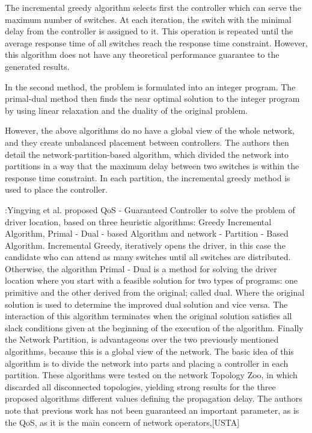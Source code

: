 \documentclass[a4paper,10pt]{article}
\begin{document}
The incremental greedy algorithm selects first the controller which can serve the maximum number of switches. At each iteration, the switch with the minimal delay from the controller is assigned to it. This operation is repeated until the average response time of all switches reach the response time constraint. However, this algorithm does not have any theoretical performance guarantee to the generated results. 

In the second method, the problem is formulated into an integer program. The primal-dual method then finds the near optimal solution to the integer program by using linear relaxation and the duality of the original problem. 

However, the above algorithms do no have a global view of the whole network, and they create unbalanced placement between controllers. The authors then detail the network-partition-based algorithm, which divided the network into partitions in a way that the maximum delay between two switches is within the response time constraint. In each partition, the incremental greedy method is used to place the controller.

\cite{ChWa15}:Yingying et al. proposed QoS - Guaranteed Controller to solve the problem of driver location, based on three heuristic algorithms: Greedy Incremental Algorithm, Primal - Dual - based Algorithm and network - Partition - Based Algorithm. Incremental Greedy, iteratively opens the driver, in this case the candidate who can attend as many switches until all switches are distributed. Otherwise, the algorithm Primal - Dual is a method for solving the driver location where you start with a feasible solution for two types of programs: one primitive and the other derived from the original; called dual. Where the original solution is used to determine the improved dual solution and vice versa. The interaction of this algorithm terminates when the original solution satisfies all slack conditions given at the beginning of the execution of the algorithm. Finally the Network Partition, is advantageous over the two previously mentioned algorithms, because this is a global view of the network. The basic idea of this algorithm is to divide the network into parts and placing a controller in each partition. These algorithms were tested on the network Topology Zoo, in which discarded all disconnected topologies, yielding strong results for the three proposed algorithms different values defining the propagation delay. The authors note that previous work has not been guaranteed an important parameter, as is the QoS, as it is the main concern of network operators,[USTA]
\end{document}
